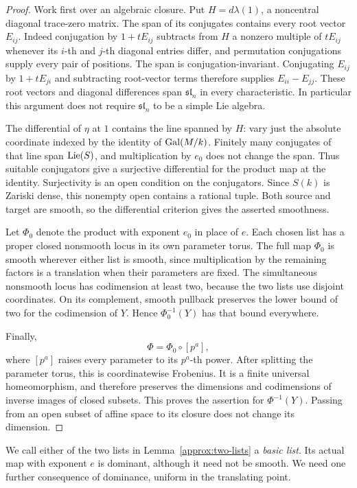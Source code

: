 \begin{proof}
Work first over an algebraic closure.  Put
$H=d\lambda(1)$, a noncentral diagonal trace-zero matrix.
The span of its conjugates contains every root vector $E_{ij}$.
Indeed conjugation by $1+tE_{ij}$ subtracts from $H$ a nonzero
multiple of $tE_{ij}$ whenever its $i$-th and $j$-th diagonal
entries differ, and permutation conjugations supply every pair
of positions.  The span is conjugation-invariant.  Conjugating
$E_{ij}$ by $1+tE_{ji}$ and subtracting root-vector terms
therefore supplies $E_{ii}-E_{jj}$.  These root vectors and
diagonal differences span $\mathfrak{sl}_n$ in every
characteristic.  In particular this argument does not require
$\mathfrak{sl}_n$ to be a simple Lie algebra.

The differential of $\eta$ at $1$ contains the line spanned by
$H$: vary just the absolute coordinate indexed by the identity
of $\operatorname{Gal}(M/k)$.  Finitely many conjugates of that line span
$\operatorname{Lie}(S)$, and multiplication by $e_0$ does not change the span.
Thus suitable conjugators give a surjective differential for
the product map at the identity.  Surjectivity is an open
condition on the conjugators.  Since $S(k)$ is Zariski dense,
this nonempty open contains a rational tuple.  Both source and
target are smooth, so the differential criterion gives the
asserted smoothness.

Let $\Phi_0$ denote the product with exponent $e_0$ in place
of $e$.  Each chosen list has a proper closed nonsmooth locus
in its own parameter torus.  The full map $\Phi_0$ is smooth
wherever either list is smooth, since multiplication by the
remaining factors is a translation when their parameters are
fixed.  The simultaneous nonsmooth locus has codimension at
least two, because the two lists use disjoint coordinates.
On its complement, smooth pullback preserves the lower bound
of two for the codimension of $Y$.  Hence
$\Phi_0^{-1}(Y)$ has that bound everywhere.

Finally,
\[
 \Phi=\Phi_0\circ[p^a],
\]
where $[p^a]$ raises every parameter to its $p^a$-th power.
After splitting the parameter torus, this is coordinatewise
Frobenius.  It is a finite universal homeomorphism, and
therefore preserves the dimensions and codimensions of inverse
images of closed subsets.  This proves the assertion for
$\Phi^{-1}(Y)$.  Passing from an open subset of affine space
to its closure does not change its dimension.
\end{proof}

We call either of the two lists in Lemma~\ref{approx:two-lists}
a \emph{basic list}.  Its actual map with exponent $e$ is
dominant, although it need not be smooth.  We need one further
consequence of dominance, uniform in the translating point.

